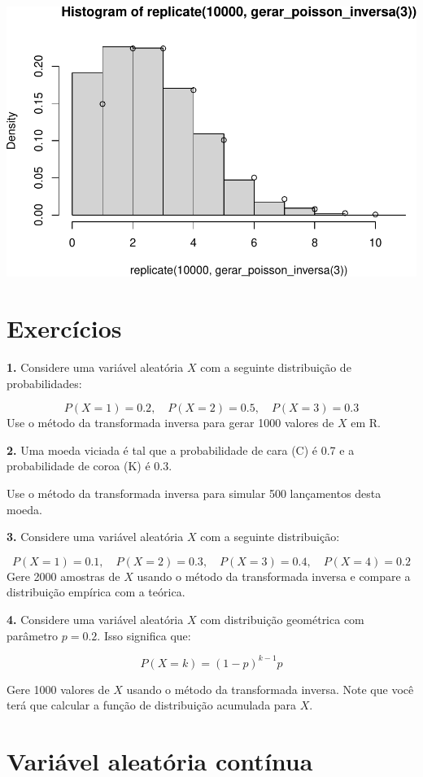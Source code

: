 \documentclass[
]{book}
\begin{document}
\includegraphics{introR_files/figure-latex/unnamed-chunk-281-1.pdf}

\section{Exercícios}\label{exercuxedcios-23}

\textbf{1.} Considere uma variável aleatória \(X\) com a seguinte distribuição
de probabilidades:

\[P(X = 1) = 0.2, \quad P(X = 2) = 0.5, \quad P(X = 3) = 0.3\] Use o
método da transformada inversa para gerar 1000 valores de \(X\) em R.

\textbf{2.} Uma moeda viciada é tal que a probabilidade de cara (C) é 0.7 e a
probabilidade de coroa (K) é 0.3.

Use o método da transformada inversa para simular 500 lançamentos desta
moeda.

\textbf{3.} Considere uma variável aleatória \(X\) com a seguinte distribuição:

\[P(X = 1) = 0.1, \quad P(X = 2) = 0.3, \quad P(X = 3) = 0.4, \quad P(X = 4) = 0.2\]
Gere 2000 amostras de \(X\) usando o método da transformada inversa e
compare a distribuição empírica com a teórica.

\textbf{4.} Considere uma variável aleatória \(X\) com distribuição geométrica
com parâmetro \(p = 0.2\). Isso significa que:

\[P(X = k) = (1 - p)^{k-1}p\]

Gere 1000 valores de \(X\) usando o método da transformada inversa. Note
que você terá que calcular a função de distribuição acumulada para \(X\).

\section{Variável aleatória contínua}\label{variuxe1vel-aleatuxf3ria-contuxednua}
\end{document}

